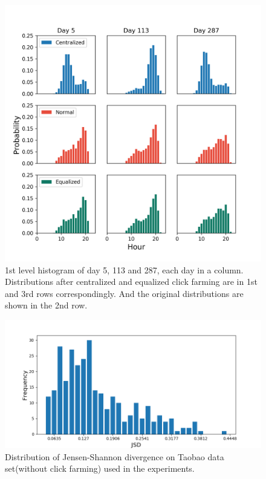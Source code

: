 \documentclass[10pt,conference,letterpaper]{article}
\begin{document}
		\begin{figure}[!t]
			\centering
			\includegraphics[width=\linewidth]{fig/Raw1stLevelHist.png}
			\caption{1st level histogram of day 5, 113 and 287, each day in a column. Distributions after centralized and equalized click farming are in 1st and 3rd rows correspondingly. And the original distributions are shown in the 2nd row.}
			\label{fig:raw-hist-1st}
		\end{figure}
		
		\begin{figure}[!t]
			\centering
			\includegraphics[width=\linewidth]{fig/JSD-Dist.png}
			\caption{Distribution of Jensen-Shannon divergence on Taobao data set(without click farming) used in the experiments.}
			\label{fig:jsd-dist}
		\end{figure}
		
\end{document}
